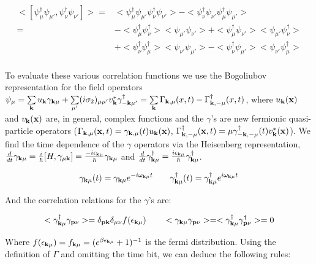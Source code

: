 \documentclass[prb,showpacs,amssymb,amsmath,twocolumn]{revtex4-1}
\begin{document}
\begin{widetext}
\begin{align*}
<[\psi^\dagger_{\mu} \psi_{\mu'},\psi^\dagger_{\nu} \psi_{\nu'}]>=&<\psi^\dagger_{\mu} \psi_{\mu'}\psi^\dagger_{\nu} \psi_{\nu'}>-<\psi^\dagger_{\nu} \psi_{\nu'}\psi^\dagger_{\mu} \psi_{\mu'}> \\
=&-<\psi^\dagger_{\mu}\psi^\dagger_{\nu}><\psi_{\mu'}\psi_{\nu'}>+<\psi^\dagger_{\mu}\psi_{\nu'}><\psi_{\mu'}\psi^\dagger_{\nu}> \\ 
&+<\psi^\dagger_{\nu}\psi^\dagger_{\mu}><\psi_{\nu'}\psi_{\mu'}>-<\psi^\dagger_{\nu}\psi_{\mu'}><\psi_{\nu'}\psi^\dagger_{\mu}> \\
\end{align*}

To evaluate these various correlation functions we use the Bogoliubov representation for the field operators $\psi_\mu = \sum\limits_{{\bf k}}u_{\bf k} \gamma_{{\bf k} \mu} + \sum\limits_{\mu'}(i\sigma_2)_{\mu\mu'} v_{\bf k}^* \gamma^\dag_{-{\bf k} \mu'}=\sum\limits_{\bf k} \Gamma_{{\bf k},\mu}(x,t)-\Gamma_{{\bf k},-\mu}^\dagger(x,t)$, where $u_{\bf k}({\bf x})$ and $v_{\bf k}({\bf x})$ are, in general, complex functions and the $\gamma$'s are new fermionic quasi-particle operators ($\Gamma_{{\bf k},\mu}({\bf x},t)=\gamma_{{\bf k},\mu}(t)u_{\bf k}({\bf x})$, $\Gamma_{{\bf k},-\mu}^\dagger({\bf x},t)=\mu\gamma_{-{\bf k},-\mu}^\dagger(t)v^*_{{\bf k}}({\bf x})$). We find the time dependence of the $\gamma$ operators via the Heisenberg representation, $\frac{d}{dt}\gamma_{{\bf k}\mu}=\frac{i}{\hbar}[H,\gamma_{\mu{\bf k}}]=\frac{-i\epsilon_{{\bf k}\mu}}{\hbar}\gamma_{{\bf k}\mu}$ and $\frac{d}{dt}\gamma^\dagger_{{\bf k}\mu}=\frac{i\epsilon_{{\bf k}\mu}}{\hbar}\gamma^\dagger_{{\bf k}\mu}$.

\begin{equation*}
\gamma_{{\bf k}\mu}(t)=\gamma_{{\bf k}\mu}e^{-i\omega_{{\bf k}\mu}t}\quad\quad \gamma^\dagger_{{\bf k}\mu}(t)=\gamma^\dagger_{{\bf k}\mu}e^{i\omega_{{\bf k}\mu}t}
\end{equation*}

And the correlation relations for the $\gamma$'s are:

\begin{equation*}
<\gamma^\dagger_{{\bf k}\mu}\gamma_{{\bf p}\nu}>=\delta_{{\bf p}{\bf k}}\delta_{\mu\nu}f(\epsilon_{{\bf k}\mu}) \quad\quad <\gamma_{{\bf k}\mu}\gamma_{{\bf p}\nu}>=<\gamma^\dagger_{{\bf k}\mu}\gamma^\dagger_{{\bf p}\nu}>=0
\end{equation*}

Where $f(\epsilon_{{\bf k}\mu})=f_{{\bf k}\mu}=(e^{\beta{\epsilon_{{\bf k}\mu}}}+1)^{-1}$ is the fermi distribution. Using the definition of $\Gamma$ and omitting the time bit, we can deduce the following rules:


\end{widetext}
\end{document}
